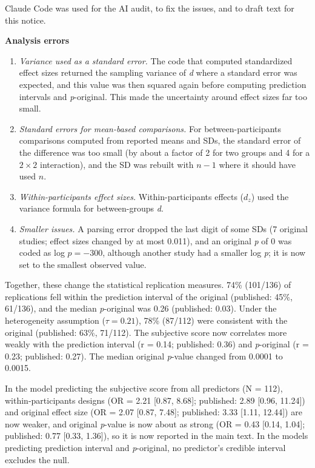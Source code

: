 \documentclass[
  english,
  a4paper,
]{article}
\providecommand{\tightlist}{%
  \setlength{\itemsep}{0pt}\setlength{\parskip}{0pt}}
\begin{document}
Claude Code was used for the AI audit, to fix the issues, and to draft text for this notice.

\textbf{Analysis errors}

\begin{enumerate}
\def\labelenumi{\arabic{enumi}.}
\tightlist
\item
  \emph{Variance used as a standard error.} The code that computed standardized effect sizes returned the sampling variance of \emph{d} where a standard error was expected, and this value was then squared again before computing prediction intervals and \emph{p}-original. This made the uncertainty around effect sizes far too small.
\item
  \emph{Standard errors for mean-based comparisons.} For between-participants comparisons computed from reported means and SDs, the standard error of the difference was too small (by about a factor of 2 for two groups and 4 for a \(2 \times 2\) interaction), and the SD was rebuilt with \(n - 1\) where it should have used \(n\).
\item
  \emph{Within-participants effect sizes.} Within-participants effects (\(d_z\)) used the variance formula for between-groups \emph{d}.
\item
  \emph{Smaller issues.} A parsing error dropped the last digit of some SDs (7 original studies; effect sizes changed by at most 0.011), and an original \emph{p} of 0 was coded as log \(p = -300\), although another study had a smaller log \emph{p}; it is now set to the smallest observed value.
\end{enumerate}

Together, these change the statistical replication measures. 74\% (101/136) of replications fell within the prediction interval of the original (published: 45\%, 61/136), and the median \emph{p}-original was 0.26 (published: 0.03). Under the heterogeneity assumption (\(\tau = 0.21\)), 78\% (87/112) were consistent with the original (published: 63\%, 71/112). The subjective score now correlates more weakly with the prediction interval (r = 0.14; published: 0.36) and \emph{p}-original (r = 0.23; published: 0.27). The median original \emph{p}-value changed from 0.0001 to 0.0015.

In the model predicting the subjective score from all predictors (N = 112), within-participants designs (OR = 2.21 {[}0.87, 8.68{]}; published: 2.89 {[}0.96, 11.24{]}) and original effect size (OR = 2.07 {[}0.87, 7.48{]}; published: 3.33 {[}1.11, 12.44{]}) are now weaker, and original \emph{p}-value is now about as strong (OR = 0.43 {[}0.14, 1.04{]}; published: 0.77 {[}0.33, 1.36{]}), so it is now reported in the main text. In the models predicting prediction interval and \emph{p}-original, no predictor's credible interval excludes the null.
\end{document}
